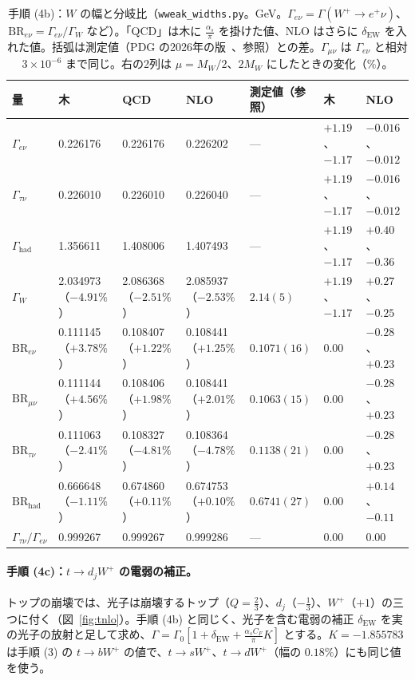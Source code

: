 \documentclass[a4paper,10pt]{ltjsarticle}
\begin{document}
\begin{table}[tbp]
\centering\footnotesize\setlength{\tabcolsep}{4pt}
\caption{手順 (4b)：$W$ の幅と分岐比（\texttt{wweak\_widths.py}。GeV。$\Gamma_{e\nu}=\Gamma(W^+\to e^+\nu)$、$\mathrm{BR}_{e\nu}=\Gamma_{e\nu}/\Gamma_W$ など）。「QCD」は木に $\frac{\alpha_s}\pi$ を掛けた値、NLO はさらに $\delta_{\mathrm{EW}}$ を入れた値。括弧は測定値（PDG の2026年の版~\cite{pdg26}、参照）との差。$\Gamma_{\mu\nu}$ は $\Gamma_{e\nu}$ と相対 $3\times10^{-6}$ まで同じ。右の2列は $\mu=M_W/2$、$2M_W$ にしたときの変化（$\%$）。}
\label{tab:wwidths}
\begin{tabular}{lllll|ll}
\toprule
量 & 木 & QCD & NLO & 測定値（参照） & 木 & NLO \\
\midrule
$\Gamma_{e\nu}$ & 0.226176 & 0.226176 & 0.226202 & — & $+1.19$、$-1.17$ & $-0.016$、$-0.012$ \\
$\Gamma_{\tau\nu}$ & 0.226010 & 0.226010 & 0.226040 & — & $+1.19$、$-1.17$ & $-0.016$、$-0.012$ \\
$\Gamma_{\mathrm{had}}$ & 1.356611 & 1.408006 & 1.407493 & — & $+1.19$、$-1.17$ & $+0.40$、$-0.36$ \\
$\Gamma_W$ & 2.034973（$-4.91\%$） & 2.086368（$-2.51\%$） & 2.085937（$-2.53\%$） & $2.14(5)$ & $+1.19$、$-1.17$ & $+0.27$、$-0.25$ \\
$\mathrm{BR}_{e\nu}$ & 0.111145（$+3.78\%$） & 0.108407（$+1.22\%$） & 0.108441（$+1.25\%$） & $0.1071(16)$ & $0.00$ & $-0.28$、$+0.23$ \\
$\mathrm{BR}_{\mu\nu}$ & 0.111144（$+4.56\%$） & 0.108406（$+1.98\%$） & 0.108441（$+2.01\%$） & $0.1063(15)$ & $0.00$ & $-0.28$、$+0.23$ \\
$\mathrm{BR}_{\tau\nu}$ & 0.111063（$-2.41\%$） & 0.108327（$-4.81\%$） & 0.108364（$-4.78\%$） & $0.1138(21)$ & $0.00$ & $-0.28$、$+0.23$ \\
$\mathrm{BR}_{\mathrm{had}}$ & 0.666648（$-1.11\%$） & 0.674860（$+0.11\%$） & 0.674753（$+0.10\%$） & $0.6741(27)$ & $0.00$ & $+0.14$、$-0.11$ \\
$\Gamma_{\tau\nu}/\Gamma_{e\nu}$ & 0.999267 & 0.999267 & 0.999286 & — & $0.00$ & $0.00$ \\
\bottomrule
\end{tabular}
\end{table}

\FloatBarrier
\paragraph{手順 (4c)：$t\to d_jW^+$ の電弱の補正。}トップの崩壊では、光子は崩壊するトップ（$Q=\frac23$）、$d_j$（$-\frac13$）、$W^+$（$+1$）の三つに付く（図~\ref{fig:tnlo}）。手順 (4b) と同じく、光子を含む電弱の補正 $\delta_{\mathrm{EW}}$ を実の光子の放射と足して求め、$\Gamma=\Gamma_0[1+\delta_{\mathrm{EW}}+\frac{\alpha_sC_F}\pi K]$ とする。$K=-1.855783$ は手順 (3) の $t\to bW^+$ の値で、$t\to sW^+$、$t\to dW^+$（幅の $0.18\%$）にも同じ値を使う。
\end{document}

